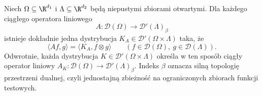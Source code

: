 \begin{twierdzenie}
\label{thm:schwartz-kernel23}
Niech $\Omega\subseteq\R^{d_1}$ i
$\Lambda\subseteq\R^{d_2}$ będą niepustymi zbiorami
otwartymi. Dla każdego ciągłego operatora liniowego
\[
 A:\mathcal D(\Omega)\longrightarrow
 \mathcal D'(\Lambda)_\beta
\]
istnieje dokładnie jedna dystrybucja
$K_A\in\mathcal D'(\Omega\times\Lambda)$ taka, że
\[
 \langle Af,g\rangle=\langle K_A,f\otimes g\rangle
 \qquad(f\in\mathcal D(\Omega),\ g\in\mathcal D(\Lambda)).
\]
Odwrotnie, każda dystrybucja
$K\in\mathcal D'(\Omega\times\Lambda)$ określa w ten
sposób ciągły operator liniowy
$A_K:\mathcal D(\Omega)\to\mathcal D'(\Lambda)_\beta$.
Indeks $\beta$ oznacza silną topologię przestrzeni dualnej,
czyli jednostajną zbieżność na ograniczonych zbiorach
funkcji testowych.
\end{twierdzenie}
